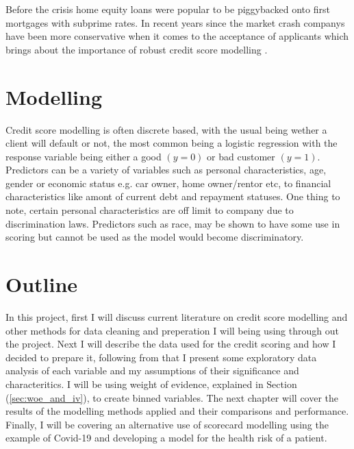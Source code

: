  Before the crisis home equity loans were popular to be piggybacked onto first mortgages with subprime rates. In recent years since the market crash companys have been more conservative when it comes to the acceptance of applicants which brings about the importance of robust credit score modelling \parencite{corelogic2016home}.

\section{Modelling}
Credit score modelling is often discrete based, with the usual being wether a client will default or not, the most common being a logistic regression with the response variable being either a good $(y=0)$ or bad customer $(y=1)$. Predictors can be a variety of variables such as personal characteristics, age, gender or economic status e.g. car owner, home owner/rentor etc, to financial characteristics like amont of current debt and repayment statuses. One thing to note, certain personal characteristics are off limit to company due to discrimination laws. Predictors such as race, may be shown to have some use in scoring but cannot be used as the model would become discriminatory.\\

\section{Outline}
In this project, first I will discuss current literature on credit score modelling and other methods for data cleaning and preperation I will being using through out the project. Next I will describe the data used for the credit scoring and how I decided to prepare it, following from that I present some exploratory data analysis of each variable and my assumptions of their significance and characteritics. I will be using weight of evidence, explained in Section (\ref{sec:woe_and_iv}), to create binned variables. The next chapter will cover the results of the modelling methods applied and their comparisons and performance. Finally, I will be covering an alternative use of scorecard modelling using the example of Covid-19 and developing a model for the health risk of a patient.